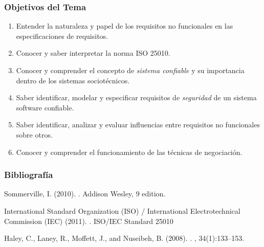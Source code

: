 \documentclass[handout,a4paper,slidestop,xcolor=pst,dvips,blue]{beamer}
\begin{document}
\begin{frame}[c]
    \frametitle{Objetivos del Tema}
    \begin{enumerate}
         \item Entender la naturaleza y papel de los requisitos no funcionales en las especificaciones de requisitos.
         \item Conocer y saber interpretar la norma ISO 25010.
         \item Conocer y comprender el concepto de \emph{sistema confiable} y su importancia dentro de los sistemas sociotécnicos.
         \item Saber identificar, modelar y especificar requisitos de \emph{seguridad} de un sistema software confiable.
         \item Saber identificar, analizar y evaluar influencias entre requisitos no funcionales sobre otros.
         \item Conocer y comprender el funcionamiento de las técnicas de negociación.
    \end{enumerate}
\end{frame}

\begin{frame}[t]
    \frametitle{Bibliografía}
    \begin{thebibliography}{}
        Sommerville, I. (2010).
        .
        \newblock Addison Wesley, 9 edition.

        International Standard Organization (ISO) / International Electrotechnical Commission (IEC) (2011).
        . ISO/IEC Standard 25010

        Haley, C., Laney, R., Moffett, J., and Nuseibeh, B. (2008).
        .
        , 34(1):133--153.
    \end{thebibliography}
\end{frame}
\end{document}
